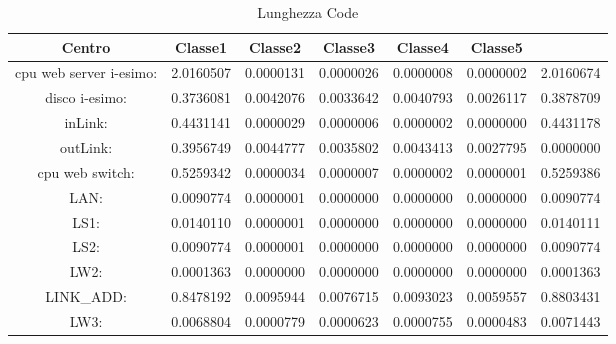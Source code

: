 \begin{table}[H]
\begin{center}\begin{scriptsize}
\begin{tabular}{||c|c|c|c|c|c||}
\hline
Centro &Classe1 &Classe2 &Classe3 &Classe4 &Classe5\\
\hline
\hline
 cpu web server i-esimo: 	&2.0160507	&0.0000131	&0.0000026	&0.0000008	&0.0000002	&2.0160674	\\\hline
 disco i-esimo: 	&0.3736081	&0.0042076	&0.0033642	&0.0040793	&0.0026117	&0.3878709	\\\hline
 inLink: 	&0.4431141	&0.0000029	&0.0000006	&0.0000002	&0.0000000	&0.4431178	\\\hline
 outLink: 	&0.3956749	&0.0044777	&0.0035802	&0.0043413	&0.0027795	&0.0000000	\\\hline
 cpu web switch: 	&0.5259342	&0.0000034	&0.0000007	&0.0000002	&0.0000001	&0.5259386	\\\hline
 LAN: 	&0.0090774	&0.0000001	&0.0000000	&0.0000000	&0.0000000	&0.0090774	\\\hline
 LS1: 	&0.0140110	&0.0000001	&0.0000000	&0.0000000	&0.0000000	&0.0140111	\\\hline
 LS2: 	&0.0090774	&0.0000001	&0.0000000	&0.0000000	&0.0000000	&0.0090774	\\\hline
 LW2: 	&0.0001363	&0.0000000	&0.0000000	&0.0000000	&0.0000000	&0.0001363	\\\hline
 LINK_ADD: 	&0.8478192	&0.0095944	&0.0076715	&0.0093023	&0.0059557	&0.8803431	\\\hline
 LW3: 	&0.0068804	&0.0000779	&0.0000623	&0.0000755	&0.0000483	&0.0071443	\\\hline
\end{tabular}
\end{scriptsize}\end{center}
\caption{Lunghezza Code}
\label{lunghezzacode}
\end{table}


